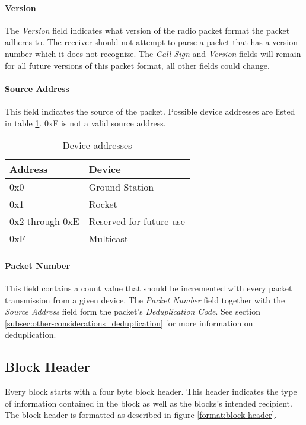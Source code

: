 \paragraph{Version}
The \emph{Version} field indicates what version of the radio packet format the packet adheres to. The receiver should
not attempt to parse a packet that has a version number which it does not recognize. The \emph{Call Sign} and
\emph{Version} fields will remain for all future versions of this packet format, all other fields could change.

\paragraph{Source Address}
This field indicates the source of the packet. Possible device addresses are listed in table \ref{table:dev-addresses}.
0xF is not a valid source address.

\begin{table}[H]
    \centering
    \begin{tabular}{@{}ll@{}}
        \toprule
        Address         & Device                  \\
        \midrule
        0x0             & Ground Station          \\
        0x1             & Rocket                  \\
        0x2 through 0xE & Reserved for future use \\
        0xF             & Multicast               \\
        \bottomrule
    \end{tabular}
    \caption{Device addresses}
    \label{table:dev-addresses}
\end{table}

\paragraph{Packet Number}
This field contains a count value that should be incremented with every packet transmission from a given device. The
\emph{Packet Number} field together with the \emph{Source Address} field form the packet's \emph{Deduplication Code}.
See section \ref{subsec:other-considerations_deduplication} for more information on deduplication.

\subsection{Block Header}
Every block starts with a four byte block header. This header indicates the type of information contained in the block
as well as the blocks’s intended recipient. The block header is formatted as described in figure
\ref{format:block-header}.

